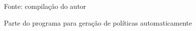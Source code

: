 \begin{figure}[!h]
	\centering
	\caption{Parte do programa para geração de políticas automaticamente}
	
	\label{fig:geracao-politicas-parte1}
	{\scriptsize Fonte: compilação do autor}
\end{figure}


